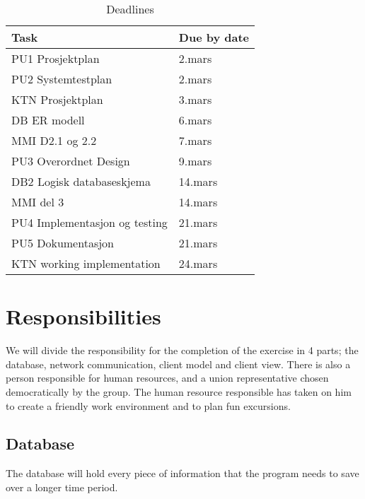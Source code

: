 \documentclass[a4paper, english, 12pt]{article}
\begin{document}
\begin{table}[h]
    \begin{center}
    \caption{Deadlines} 
    \label{deadline}
    \vspace{0,5cm}
    \begin{tabular}{| l | l |}  
        \hline
        Task & Due by date \\
        \hline 
    PU1  Prosjektplan & 2.mars \\
    PU2  Systemtestplan & 2.mars\\
    KTN  Prosjektplan & 3.mars\\
    DB   ER modell& 6.mars\\
    MMI  D2.1 og 2.2 & 7.mars\\
    PU3  Overordnet Design & 9.mars\\
    DB2  Logisk databaseskjema & 14.mars\\
    MMI  del 3 & 14.mars\\
    PU4  Implementasjon og testing & 21.mars\\
    PU5  Dokumentasjon & 21.mars\\
    KTN  working implementation & 24.mars\\
        \hline
    \end{tabular}
    \end{center}
\end{table}



\section{Responsibilities}
We will divide the responsibility for the completion of the exercise in 4 parts; the database, network communication, client model and client view.  There is also a person responsible for human resources, and a union representative chosen democratically by the group. The human resource responsible has taken on him to create a friendly work environment and to plan fun excursions.

\subsection{Database}
The database will hold every piece of information that the program needs to save over a longer time period. 
\end{document}
